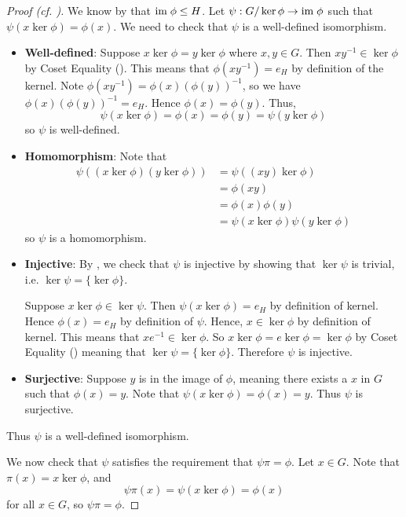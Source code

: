 \begin{proof}[Proof (cf. {\cite[p.~250, Theorem 2]{cohn_1982}})]
    We know by  that $\mathrm{im}\;\phi \leq H$. Let $\psi: G/\ker\phi \to \mathrm{im}\;\phi$ such that $\psi(x\ker\phi) = \phi(x)$. We need to check that $\psi$ is a well-defined isomorphism.
    \begin{itemize}
        \item \textbf{Well-defined}: Suppose $x\ker\phi = y\ker\phi$ where $x, y \in G$. Then $xy^{-1} \in \ker\phi$ by Coset Equality (). This means that $\phi(xy^{-1}) = e_H$ by definition of the kernel. Note $\phi(xy^{-1}) = \phi(x)\left(\phi(y)\right)^{-1}$, so we have $\phi(x)\left(\phi(y)\right)^{-1} = e_H$. Hence $\phi(x) = \phi(y)$. Thus,
        \[
            \psi(x\ker\phi) = \phi(x) = \phi(y) = \psi(y\ker\phi)
        \]
        so $\psi$ is well-defined.

        \item \textbf{Homomorphism}: Note that
        \begin{align*}
            \psi((x\ker\phi)(y\ker\phi)) &= \psi((xy)\ker\phi)\\
            &= \phi(xy)\\
            &= \phi(x)\phi(y)\\
            &= \psi(x\ker\phi)\psi(y\ker\phi)
        \end{align*}
        so $\psi$ is a homomorphism.
        \item \textbf{Injective}: By , we check that $\psi$ is injective by showing that $\ker\psi$ is trivial, i.e. $\ker\psi = \{\ker\phi\}$.

        Suppose $x\ker\phi\in\ker\psi$. Then $\psi(x\ker\phi) = e_H$ by definition of kernel. Hence $\phi(x) = e_H$ by definition of $\psi$. Hence, $x \in \ker\phi$ by definition of kernel. This means that $xe^{-1} \in \ker\phi$. So $x\ker\phi = e\ker\phi = \ker\phi$ by Coset Equality () meaning that $\ker\psi = \{\ker\phi\}$. Therefore $\psi$ is injective.

        \item \textbf{Surjective}: Suppose $y$ is in the image of $\phi$, meaning there exists a $x$ in $G$ such that $\phi(x) = y$. Note that $\psi(x\ker\phi) = \phi(x) = y$. Thus $\psi$ is surjective.
    \end{itemize}
    Thus $\psi$ is a well-defined isomorphism.

    We now check that $\psi$ satisfies the requirement that $\psi\pi = \phi$. Let $x \in G$. Note that $\pi(x) = x\ker\phi$, and
    \[
        \psi\pi(x) = \psi(x\ker\phi) = \phi(x)
    \]
    for all $x \in G$, so $\psi\pi = \phi$.


\end{proof}
